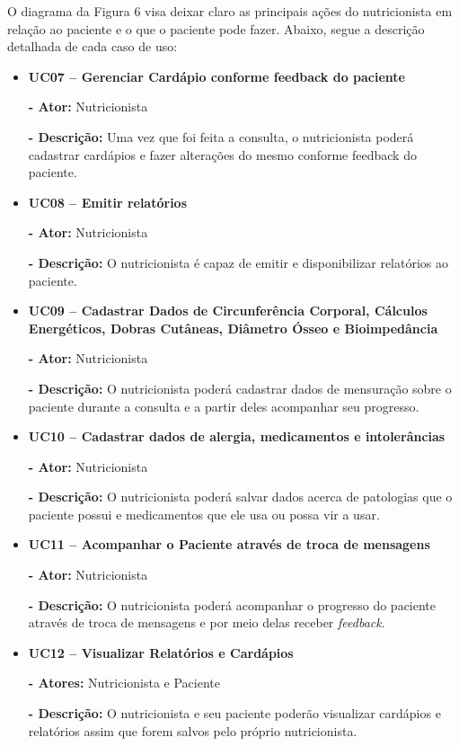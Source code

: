O diagrama da Figura 6 visa deixar claro as principais ações do nutricionista
em relação ao paciente e o que o paciente pode fazer. Abaixo, segue a descrição
detalhada de cada caso de uso:

\begin{itemize}
\item \textbf{UC07 – Gerenciar Cardápio conforme feedback do paciente}

\textbf{- Ator:} Nutricionista

\textbf{- Descrição:} Uma vez que foi feita a consulta, o nutricionista poderá cadastrar cardápios e fazer alterações do mesmo conforme feedback do paciente.

\item \textbf{UC08 – Emitir relatórios}

\textbf{- Ator:} Nutricionista

\textbf{- Descrição:} O nutricionista é capaz de emitir e disponibilizar
relatórios ao paciente.

\item \textbf{UC09 – Cadastrar Dados de Circunferência Corporal, Cálculos Energéticos, Dobras Cutâneas, Diâmetro Ósseo e Bioimpedância}

\textbf{- Ator:} Nutricionista

\textbf{- Descrição:} O nutricionista poderá cadastrar dados de mensuração sobre o paciente durante a consulta e a partir deles acompanhar seu progresso.

\item \textbf{UC10 – Cadastrar dados de alergia, medicamentos e intolerâncias}

\textbf{- Ator:} Nutricionista

\textbf{- Descrição:} O nutricionista poderá salvar dados acerca de patologias que o paciente possui e medicamentos que ele usa ou possa vir a usar.

\item \textbf{UC11 – Acompanhar o Paciente através de troca de mensagens}

\textbf{- Ator:} Nutricionista

\textbf{- Descrição:} O nutricionista poderá acompanhar o progresso do paciente através de troca de mensagens e por meio delas receber \textit{feedback}.

\item \textbf{UC12 – Visualizar Relatórios e Cardápios}

\textbf{- Atores:} Nutricionista e Paciente

\textbf{- Descrição:} O nutricionista e seu paciente poderão visualizar cardápios e relatórios assim que forem salvos pelo próprio nutricionista.


\end{itemize}

